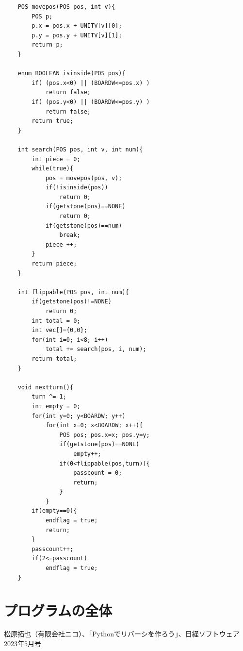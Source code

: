 \documentclass[uplatex,a4paper,11pt,oneside,openany]{jsarticle}
\begin{document}
\begin{lstlisting}
	POS movepos(POS pos, int v){
		POS p;
		p.x = pos.x + UNITV[v][0];
		p.y = pos.y + UNITV[v][1];
		return p;
	}
	
	enum BOOLEAN isinside(POS pos){
		if( (pos.x<0) || (BOARDW<=pos.x) )
			return false;
		if( (pos.y<0) || (BOARDW<=pos.y) )
			return false;
		return true;
	}
	
	int search(POS pos, int v, int num){
		int piece = 0;
		while(true){
			pos = movepos(pos, v);
			if(!isinside(pos))
				return 0;
			if(getstone(pos)==NONE)
				return 0;
			if(getstone(pos)==num)
				break;
			piece ++;
		}
		return piece;
	}
	
	int flippable(POS pos, int num){
		if(getstone(pos)!=NONE)
			return 0;
		int total = 0;
		int vec[]={0,0};
		for(int i=0; i<8; i++)
			total += search(pos, i, num);
		return total;
	}
	
	void nextturn(){
		turn ^= 1;
		int empty = 0;
		for(int y=0; y<BOARDW; y++)
			for(int x=0; x<BOARDW; x++){
				POS pos; pos.x=x; pos.y=y;
				if(getstone(pos)==NONE)
					empty++;
				if(0<flippable(pos,turn)){
					passcount = 0;
					return;
				}
			}
		if(empty==0){
			endflag = true;
			return;
		}
		passcount++;
		if(2<=passcount)
			endflag = true;
	}
\end{lstlisting}


\section{プログラムの全体}


%
\begin{thebibliography}{99}
	 松原拓也（有限会社ニコ）、「Pythonでリバーシを作ろう」、日経ソフトウェア2023年5月号
\end{thebibliography}
%
\end{document}
